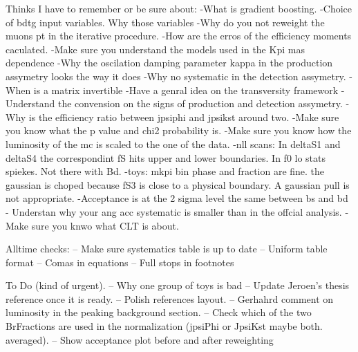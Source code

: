
Thinks I have to remember or be sure about:
-What is gradient boosting.
-Choice of bdtg input variables. Why those variables
-Why do you not reweight the muons pt in the iterative procedure.
-How are the erros of the efficiency moments caculated.
-Make sure you understand the models used in the Kpi mas dependence
-Why the oscilation damping parameter kappa in the production assymetry looks the way it does
-Why no systematic in the detection assymetry.
-When is a matrix invertible
-Have a genral idea on the transversity framework
-Understand the convension on the signs of production and detection assymetry.
-Why is the efficiency ratio between jpsiphi and jpsikst around two.
-Make sure you know what the p value and chi2 probability is.
-Make sure you know how the luminosity of the mc is scaled to the one of the data.
-nll scans:
    In deltaS1 and deltaS4 the correspondint fS hits upper and lower boundaries.
    In f0 lo stats spiekes. Not there with Bd.
-toys:
    mkpi bin phase and fraction are fine. the gaussian is choped because fS3 is close to a physical boundary. A gaussian pull is not appropriate.
-Acceptance is at the 2 sigma level the same between bs and bd
- Understan why your ang acc systematic is smaller than in the offcial analysis.
- Make sure you knwo what CLT is about.

Alltime checks:
-- Make sure systematics table is up to date
-- Uniform table format
-- Comas in equations
-- Full stops in footnotes

To Do (kind of urgent).
-- Why one group of toys is bad
-- Update Jeroen's thesis reference once it is ready.
-- Polish references layout.
-- Gerhahrd comment on luminosity in the peaking background section.
-- Check which of the two BrFractions are used in the normalization (jpsiPhi or JpsiKst maybe both. averaged).
-- Show acceptance plot before and after reweighting
